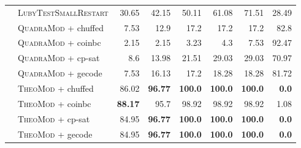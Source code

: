 \documentclass{book}
\begin{document}
\begin{table}[]
\begin{tabular}{@{}ll rr rr rr@{}}
& \textsc{LubyTestSmallRestart}   & 30.65 & 42.15 & 50.11 & 61.08 & 71.51 & 28.49 \\
& \textsc{QuadraMod} + chuffed   & 7.53 & 12.9 & 17.2 & 17.2 & 17.2 & 82.8 \\
& \textsc{QuadraMod} + coinbc   & 2.15 & 2.15 & 3.23 & 4.3 & 7.53 & 92.47 \\
& \textsc{QuadraMod} + cp-sat   & 8.6 & 13.98 & 21.51 & 29.03 & 29.03 & 70.97 \\
& \textsc{QuadraMod} + gecode   & 7.53 & 16.13 & 17.2 & 18.28 & 18.28 & 81.72 \\
& \textsc{TheoMod} + chuffed   & 86.02 & \bf 96.77 & \bf 100.0 & \bf 100.0 & \bf 100.0 &  \bf 0.0 \\
& \textsc{TheoMod} + coinbc   & \bf 88.17 & 95.7 & 98.92 & 98.92 & 98.92 & 1.08 \\
& \textsc{TheoMod} + cp-sat   & 84.95 & \bf 96.77 & \bf 100.0 & \bf 100.0 & \bf 100.0 &  \bf 0.0 \\
& \textsc{TheoMod} + gecode   & 84.95 & \bf 96.77 & \bf 100.0 & \bf 100.0 & \bf 100.0 &  \bf 0.0 \\
\bottomrule\end{tabular} 

\end{table} 



\newpage
\end{document}
